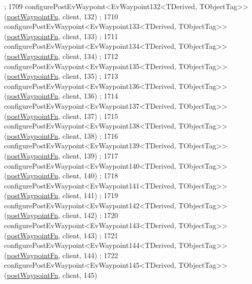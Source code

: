\begin{DoxyCode}
      ;
1709     configurePostEvWaypoint<EvWaypoint132<TDerived, TObjectTag>>(\hyperlink{classsmacc_1_1WaypointEventDispatcher_a6bccf6a93a827634b7b5e67ac0e4ec57}{postWaypointFn}, client, 132)
      ;
1710     configurePostEvWaypoint<EvWaypoint133<TDerived, TObjectTag>>(\hyperlink{classsmacc_1_1WaypointEventDispatcher_a6bccf6a93a827634b7b5e67ac0e4ec57}{postWaypointFn}, client, 133)
      ;
1711     configurePostEvWaypoint<EvWaypoint134<TDerived, TObjectTag>>(\hyperlink{classsmacc_1_1WaypointEventDispatcher_a6bccf6a93a827634b7b5e67ac0e4ec57}{postWaypointFn}, client, 134)
      ;
1712     configurePostEvWaypoint<EvWaypoint135<TDerived, TObjectTag>>(\hyperlink{classsmacc_1_1WaypointEventDispatcher_a6bccf6a93a827634b7b5e67ac0e4ec57}{postWaypointFn}, client, 135)
      ;
1713     configurePostEvWaypoint<EvWaypoint136<TDerived, TObjectTag>>(\hyperlink{classsmacc_1_1WaypointEventDispatcher_a6bccf6a93a827634b7b5e67ac0e4ec57}{postWaypointFn}, client, 136)
      ;
1714     configurePostEvWaypoint<EvWaypoint137<TDerived, TObjectTag>>(\hyperlink{classsmacc_1_1WaypointEventDispatcher_a6bccf6a93a827634b7b5e67ac0e4ec57}{postWaypointFn}, client, 137)
      ;
1715     configurePostEvWaypoint<EvWaypoint138<TDerived, TObjectTag>>(\hyperlink{classsmacc_1_1WaypointEventDispatcher_a6bccf6a93a827634b7b5e67ac0e4ec57}{postWaypointFn}, client, 138)
      ;
1716     configurePostEvWaypoint<EvWaypoint139<TDerived, TObjectTag>>(\hyperlink{classsmacc_1_1WaypointEventDispatcher_a6bccf6a93a827634b7b5e67ac0e4ec57}{postWaypointFn}, client, 139)
      ;
1717     configurePostEvWaypoint<EvWaypoint140<TDerived, TObjectTag>>(\hyperlink{classsmacc_1_1WaypointEventDispatcher_a6bccf6a93a827634b7b5e67ac0e4ec57}{postWaypointFn}, client, 140)
      ;
1718     configurePostEvWaypoint<EvWaypoint141<TDerived, TObjectTag>>(\hyperlink{classsmacc_1_1WaypointEventDispatcher_a6bccf6a93a827634b7b5e67ac0e4ec57}{postWaypointFn}, client, 141)
      ;
1719     configurePostEvWaypoint<EvWaypoint142<TDerived, TObjectTag>>(\hyperlink{classsmacc_1_1WaypointEventDispatcher_a6bccf6a93a827634b7b5e67ac0e4ec57}{postWaypointFn}, client, 142)
      ;
1720     configurePostEvWaypoint<EvWaypoint143<TDerived, TObjectTag>>(\hyperlink{classsmacc_1_1WaypointEventDispatcher_a6bccf6a93a827634b7b5e67ac0e4ec57}{postWaypointFn}, client, 143)
      ;
1721     configurePostEvWaypoint<EvWaypoint144<TDerived, TObjectTag>>(\hyperlink{classsmacc_1_1WaypointEventDispatcher_a6bccf6a93a827634b7b5e67ac0e4ec57}{postWaypointFn}, client, 144)
      ;
1722     configurePostEvWaypoint<EvWaypoint145<TDerived, TObjectTag>>(\hyperlink{classsmacc_1_1WaypointEventDispatcher_a6bccf6a93a827634b7b5e67ac0e4ec57}{postWaypointFn}, client, 145)

\end{DoxyCode}
